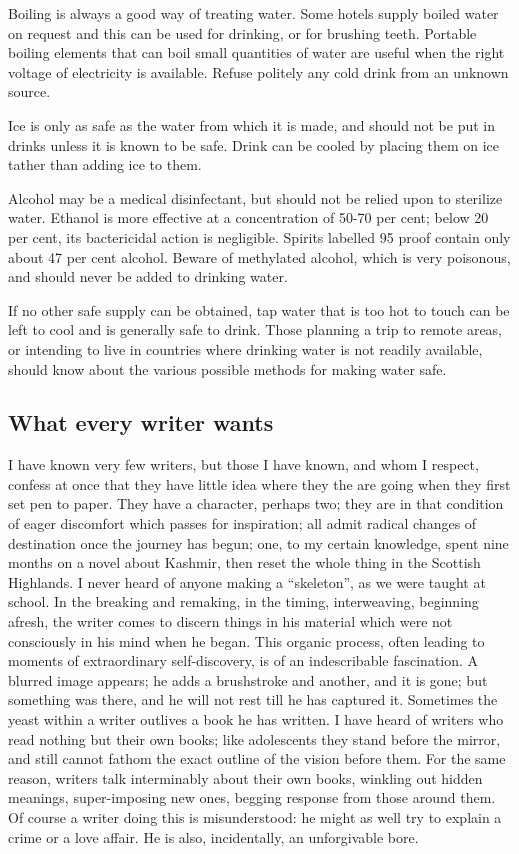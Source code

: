 \documentclass[11pt]{article}
\begin{document}
Boiling is always a good way of treating water. Some hotels supply boiled water on request and this can be used for drinking, or for brushing teeth. Portable boiling elements that can boil small quantities of water are useful when the right voltage of electricity is available. Refuse politely any cold drink from an unknown source.

Ice is only as safe as the water from which it is made, and should not be put in drinks unless it is known to be safe. Drink can be cooled by placing them on ice tather than adding ice to them.

Alcohol may be a medical disinfectant, but should not be relied upon to sterilize water. Ethanol is more effective at a concentration of 50-70 per cent; below 20 per cent, its bactericidal action is negligible. Spirits labelled 95 proof contain only about 47 per cent alcohol. Beware of methylated alcohol, which is very poisonous, and should never be added to drinking water.

If no other safe supply can be obtained, tap water that is too hot to touch can be left to cool and is generally safe to drink. Those planning a trip to remote areas, or intending to live in countries where drinking water is not readily available, should know about the various possible methods for making water safe.
\subsection{What every writer wants}
\label{sec-2-39}

I have known very few writers, but those I have known, and whom I respect, confess at once that they have little idea where they the are going when they first set pen to paper. They have a character, perhaps two; they are in that condition of eager discomfort which passes for inspiration; all admit radical changes of destination once the journey has begun; one, to my certain knowledge, spent nine months on a novel about Kashmir, then reset the whole thing in the Scottish Highlands. I never heard of anyone making a ``skeleton'', as we were taught at school. In the breaking and remaking, in the timing, interweaving, beginning afresh, the writer comes to discern things in his material which were not consciously in his mind when he began. This organic process, often leading to moments of extraordinary self-discovery, is of an indescribable fascination. A blurred image appears; he adds a brushstroke and another, and it is gone; but something was there, and he will not rest till he has captured it. Sometimes the yeast within a writer outlives a book he has written. I have heard of writers who read nothing but their own books; like adolescents they stand before the mirror, and still cannot fathom the exact outline of the vision before them. For the same reason, writers talk interminably about their own books, winkling out hidden meanings, super-imposing new ones, begging response from those around them. Of course a writer doing this is misunderstood: he might as well try to explain a crime or a love affair. He is also, incidentally, an unforgivable bore.
\end{document}
